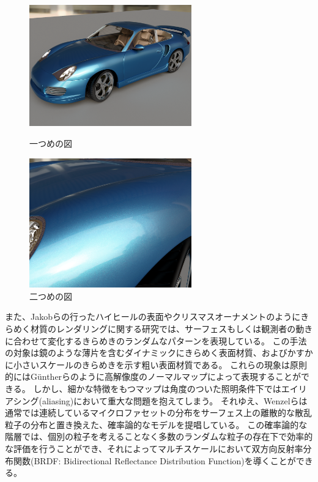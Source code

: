 \begin{figure}[htbp]
 \begin{minipage}{0.4\hsize}
  \begin{center}
   \includegraphics[width=70mm]{./img/porsche01.png}
  \end{center}
  \caption{一つめの図}
  \label{fig:one}
 \end{minipage}
 \begin{minipage}{0.75\hsize}
  \begin{center}
    \includegraphics[width=70mm]{./img/porsche03.png}
  \end{center}
  \caption{二つめの図}
  \label{fig:two}
 \end{minipage}
\end{figure}

\noindent
また、Jakobら\cite{jakob2014discrete}の行ったハイヒールの表面やクリスマスオーナメントのようにきらめく材質のレンダリングに関する研究では、サーフェスもしくは観測者の動きに合わせて変化するきらめきのランダムなパターンを表現している。
この手法の対象は鏡のような薄片を含むダイナミックにきらめく表面材質、およびかすかに小さいスケールのきらめきを示す粗い表面材質である。
これらの現象は原則的にはG\"{u}ntherらのように高解像度のノーマルマップによって表現することができる。
しかし、細かな特徴をもつマップは角度のついた照明条件下ではエイリアシング(aliasing)において重大な問題を抱えてしまう。
それゆえ、Wenzelらは通常では連続しているマイクロファセットの分布をサーフェス上の離散的な散乱粒子の分布と置き換えた、確率論的なモデルを提唱している。
この確率論的な階層では、個別の粒子を考えることなく多数のランダムな粒子の存在下で効率的な評価を行うことができ、それによってマルチスケールにおいて双方向反射率分布関数(BRDF: Bidirectional Reflectance Distribution Function)を導くことができる。


